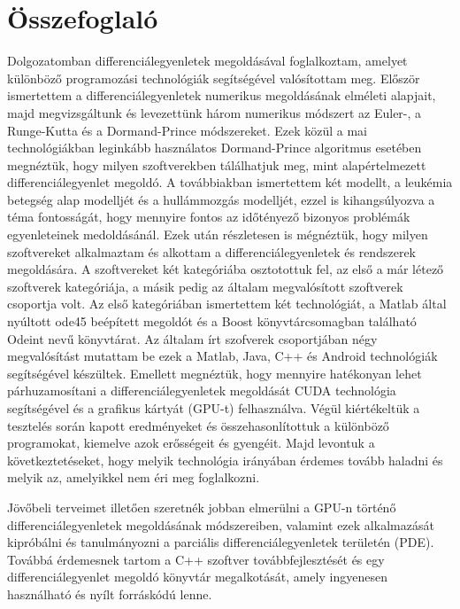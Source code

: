 \chapter*{Összefoglaló}

Dolgozatomban differenciálegyenletek megoldásával foglalkoztam, amelyet különböző programozási technológiák segítségével valósítottam meg. Először ismertettem a differenciálegyenletek numerikus megoldásának elméleti alapjait, majd megvizsgáltunk és levezettünk három numerikus módszert az Euler-, a Runge-Kutta és a Dormand-Prince módszereket. Ezek közül a mai technológiákban leginkább használatos Dormand-Prince algoritmus esetében megnéztük, hogy milyen szoftverekben tálálhatjuk meg, mint alapértelmezett differenciálegyenlet megoldó. A továbbiakban ismertettem két modellt, a leukémia betegség alap modelljét és a hullámmozgás modelljét, ezzel is kihangsúlyozva a téma fontosságát, hogy mennyire fontos az időtényező bizonyos problémák egyenleteinek medoldásánál. Ezek után részletesen is mégnéztük, hogy milyen szoftvereket alkalmaztam és alkottam a differenciálegyenletek és rendszerek megoldására. A szoftvereket két kategóriába osztotottuk fel, az első a már létező szoftverek kategóriája, a másik pedig az általam megvalósított szoftverek csoportja volt. Az első kategóriában ismertettem két technológiát, a Matlab által nyúltott ode45 beépített megoldót és a Boost könyvtárcsomagban található Odeint nevű könyvtárat. Az általam írt szofverek csoportjában négy megvalósítást mutattam be ezek a Matlab, Java, C++ és Android technológiák segítségével készültek. Emellett megnéztük, hogy mennyire hatékonyan lehet párhuzamosítani a differenciálegyenletek megoldását CUDA technológia segítségével és a grafikus kártyát (GPU-t) felhasználva. Végül kiértékeltük a tesztelés során kapott eredményeket és összehasonlítottuk a különböző programokat, kiemelve azok erősségeit és gyengéit. Majd levontuk a következtetéseket, hogy melyik technológia irányában érdemes tovább haladni és melyik az, amelyikkel nem éri meg foglalkozni.

Jövőbeli terveimet illetően szeretnék jobban elmerülni a GPU-n történő differenciálegyenletek megoldásának módszereiben, valamint ezek alkalmazását kipróbálni és tanulmányozni a parciális differenciálegyenletek területén (PDE). Továbbá érdemesnek tartom a C++ szoftver továbbfejlesztését és egy differenciálegyenlet megoldó könyvtár megalkotását, amely ingyenesen használható és nyílt forráskódú lenne.